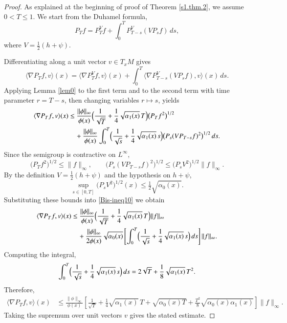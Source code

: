 \documentclass[11pt,twoside, reqno]{article}
\def\r{\right}
\def\l{\left}
\newcommand\1{\mathbbm{1}}
\theoremstyle{definition}
\numberwithin{equation}{section}
\begin{document}
\begin{proof} 
As explained at the beginning of proof of Theorem \ref{s1.thm.2}, we assume $0<T\leq 1$.
We start from the Duhamel formula,
\begin{equation*}
P_T f = P_T^V f + \int_0^T P_{T-s}^V (V P_s f) \, ds,
\end{equation*}
where \( V = \frac12 \l(h +\psi\r) \).

Differentiating along a unit vector \( v \in T_x M \) gives  
\[
\langle \nabla P_T f, v \rangle (x) = 
\langle \nabla P_T^V f, v \rangle (x) 
+ \int_0^T \langle \nabla P_{T-s}^V (V P_s f), v \rangle (x) \, ds.
\]
Applying Lemma \ref{lem0} to the first term and to the second term with time parameter $r=T-s$, then changing variables $r\mapsto s$, yields
\begin{align}\label{Bis-ineq10}
\langle \nabla P_T f, v \rangle (x) 
&\leq \frac{\|\phi\|_{\infty}}{\phi(x)}
\Bigl( \frac{1}{\sqrt{T}} + \frac14\sqrt{\alpha_1(x)}\, T \Bigr) \bigl(P_T f^2\bigr)^{1/2}  \notag \\
&\quad + \frac{\|\phi\|_{\infty}}{\phi(x)} 
\int_0^T \Bigl( \frac{1}{\sqrt{s}} + \frac14 \sqrt{\alpha_1(x)}\, s \Bigr) 
\bigl(P_s (V P_{T-s} f)^2\bigr)^{1/2} \, ds.
\end{align}
Since the semigroup is contractive on \(L^\infty\),
\[
\bigl(P_T f^2\bigr)^{1/2} \leq \|f\|_\infty , \qquad 
\bigl(P_s (V P_{T-s} f)^2\bigr)^{1/2} \leq \bigl(P_s V^2\bigr)^{1/2} \|f\|_\infty .
\]
By the definition  \(V=\frac{1}{2}(h+\psi)\) and the hypothesis on \(h+\psi\),
\[
\sup_{s\in [0,T]}\bigl(P_s V^2\bigr)^{1/2}(x) \leq \tfrac12\sqrt{\alpha_0(x)} .
\]
Substituting these bounds into \eqref{Bis-ineq10} we obtain  
\[
\begin{aligned}
\langle \nabla P_T f, v \rangle (x) 
&\leq \frac{\|\phi\|_{\infty}}{\phi(x)} 
\Bigl( \frac{1}{\sqrt{T}} + \frac14\sqrt{\alpha_1(x)}\, T \Bigr) \|f\|_\infty \\
&\quad + \frac{\|\phi\|_{\infty}}{2\phi(x)} \sqrt{\alpha_0(x)} 
\l[\int_0^T \Bigl( \frac{1}{\sqrt{s}} + \frac14 \sqrt{\alpha_1(x)}\, s \Bigr) \, ds\r] \|f\|_\infty.
\end{aligned}
\]
Computing the integral,
\[
\int_0^T \Bigl( \frac{1}{\sqrt{s}} + \frac14 \sqrt{\alpha_1(x)}\, s \Bigr) \, ds 
= 2\sqrt{T} + \frac18 \sqrt{\alpha_1(x)}\, T^2 .
\]
Therefore,
\[
\begin{aligned}
\langle \nabla P_T f, v \rangle (x) 
&\leq \frac{\|\phi\|_{\infty}}{\phi(x)} 
\l[ \frac{1}{\sqrt{T}} + \frac14\sqrt{\alpha_1(x)}\, T + \sqrt{\alpha_0(x)T} 
+ \frac{T^2}{8} \sqrt{\alpha_0(x)\alpha_1(x)} \r] \|f\|_\infty.
\end{aligned}
\]
Taking the supremum over unit vectors \(v\) gives the stated estimate.
\end{proof}
\end{document}
